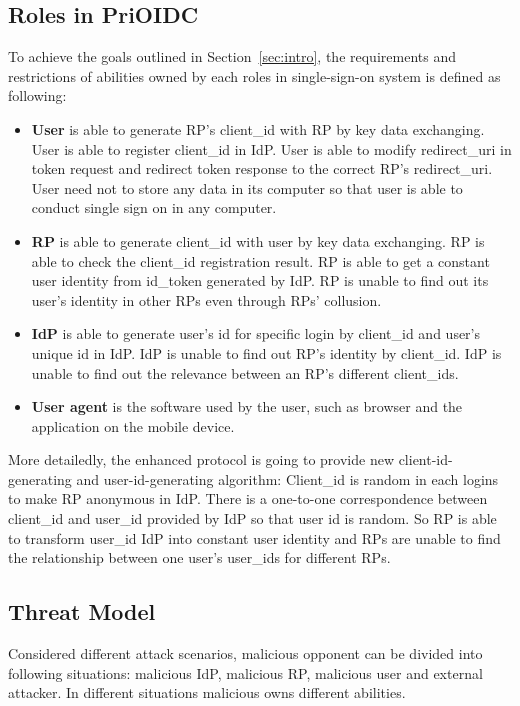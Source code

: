 \subsection{Roles in PriOIDC}
To achieve the goals outlined in Section~\ref{sec:intro}, the requirements and restrictions of abilities owned by each roles in single-sign-on system is defined as following: %
\begin{itemize}
    \item \textbf{User} is able to generate RP's client\_id with RP by key data exchanging. User is able to register client\_id in IdP. User is able to modify redirect\_uri in token request and redirect token response to the correct RP's redirect\_uri. User need not to store any data in its computer so that user is able to conduct single sign on in any computer.
    \item \textbf{RP} is able to generate client\_id with user by key data exchanging. RP is able to check the client\_id registration result. RP is able to get a constant user identity from id\_token generated by IdP. RP is unable to find out its user's identity in other RPs even through RPs' collusion. 
    \item \textbf{IdP} is able to generate user's id for specific login by client\_id and user's unique id in IdP. IdP is unable to find out RP's identity by client\_id. IdP is unable to find out the relevance between an RP's  different client\_ids. 
    \item \textbf{User agent} is the software used by the user, such as browser and the application on the mobile device.
\end{itemize}
More detailedly, the enhanced protocol is going to provide new client-id-generating and user-id-generating algorithm: Client\_id is random in each logins to make RP anonymous in IdP. There is a one-to-one correspondence between client\_id and user\_id provided by IdP so that user id is random. So RP is able to transform user\_id IdP into constant user identity and RPs are unable to find the relationship between one user's user\_ids for different RPs. 
\subsection{Threat Model}
Considered different attack scenarios, malicious opponent can be divided into following situations: malicious IdP, malicious RP, malicious user and external attacker. In different situations malicious owns different abilities.


